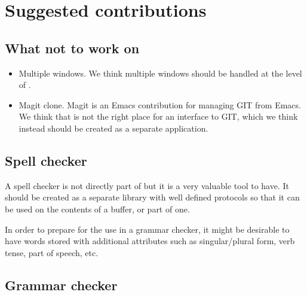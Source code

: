 \chapter{Suggested contributions}

\section{What not to work on}

\begin{itemize}
\item Multiple windows.  We think multiple windows should be handled
  at the level of \mcclim{}.
\item Magit clone.  Magit is an Emacs contribution for managing GIT
  from Emacs.  We think that \sysname{} is not the right place for an
  interface to GIT, which we think instead should be created as a
  separate \clim{} application.
\end{itemize}

\section{Spell checker}

A spell checker is not directly part of \sysname{} but it is a very
valuable tool to have.  It should be created as a separate library
with well defined protocols so that it can be used on the contents of
a \sysname{} buffer, or part of one.

In order to prepare for the use in a grammar checker, it might be
desirable to have words stored with additional attributes such as
singular/plural form, verb tense, part of speech, etc.

\section{Grammar checker}
